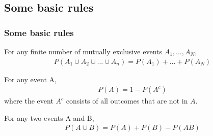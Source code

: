 \subsection{Some basic rules}

\begin{frame}
    \frametitle{Some basic rules}

    \small
    \begin{probRule}

        For any finite number of mutually exclusive events $A_1,\ldots,A_N$,
        \begin{align*}
            P(A_1\cup A_2\cup\ldots\cup A_n) = P(A_1) + \ldots + P(A_N)
        \end{align*}

    \end{probRule}

    \begin{probRule}

        For any event A,
        \begin{align*}
            P(A) = 1 - P(A^c)
        \end{align*}
        where the event $A^c$ consists of all outcomes that are not in $A$.

    \end{probRule}

    \begin{probRule}

        For any two events A and B,
        \begin{align*}
            P(A\cup B) = P(A) + P(B) - P(AB)
        \end{align*}

    \end{probRule}
    \normalsize
\end{frame}

